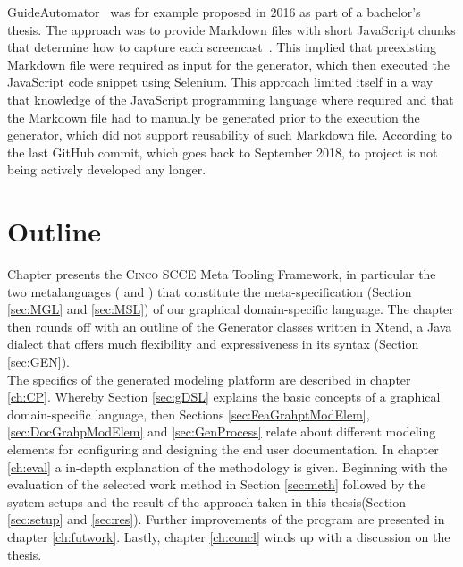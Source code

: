 GuideAutomator~\cite{oliveira2016guideautomator} was for example proposed in 2016 as part of a bachelor's thesis. The approach was to provide Markdown files with short JavaScript chunks that determine how to capture each screencast~\cite{guidAutomatorGitHub}. This implied that preexisting Markdown file were required as input for the generator, which then executed the JavaScript code snippet using Selenium. This approach limited itself in a way that knowledge of the JavaScript programming language where required and that the Markdown file had to manually be generated prior to the execution the generator, which did not support reusability of such Markdown file. According to the last GitHub commit, which goes back to September 2018, to project is not being actively developed any longer.

\section{Outline}\label{sec:outline}

Chapter  presents the \textsc{Cinco} SCCE Meta Tooling Framework, in particular the two metalanguages ( and ) that constitute the meta-specification (Section \ref{sec:MGL} and \ref{sec:MSL}) of our graphical domain-specific language. The chapter then rounds off with an outline of the Generator classes written in Xtend, a Java dialect that offers much flexibility and expressiveness in its syntax (Section \ref{sec:GEN}).\\The specifics of the generated modeling platform are described in chapter \ref{ch:CP}. Whereby Section \ref{sec:gDSL} explains the basic concepts of a graphical domain-specific language, then Sections \ref{sec:FeaGrahptModElem}, \ref{sec:DocGrahpModElem} and \ref{sec:GenProcess} relate about different modeling elements for configuring and designing the end user documentation. In chapter \ref{ch:eval} a in-depth explanation of the methodology is given. Beginning with the evaluation of the selected work method in Section \ref{sec:meth} followed by the system setups and the result of the approach taken in this thesis(Section \ref{sec:setup} and \ref{sec:res}). Further improvements of the program are presented in chapter \ref{ch:futwork}. Lastly, chapter \ref{ch:concl} winds up with a discussion on the thesis.
